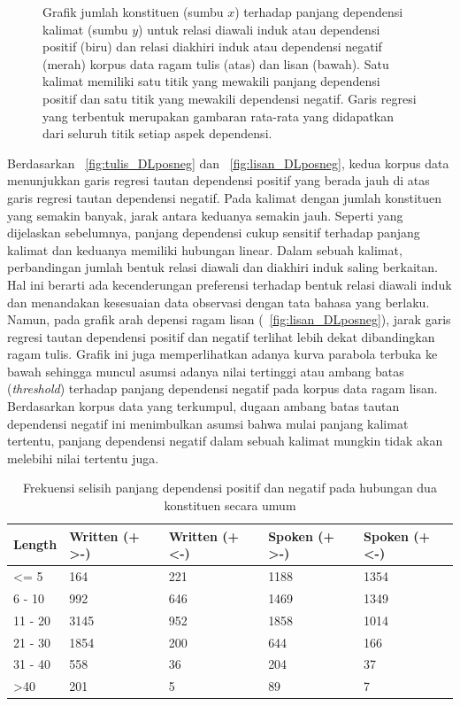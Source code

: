 \documentclass[10pt, a4paper, conference, compsocconf]{IEEEtran}
\begin{document}
\begin{figure}
\caption{Grafik jumlah konstituen (sumbu $x$) terhadap panjang dependensi kalimat (sumbu $y$) untuk relasi diawali induk atau dependensi positif (biru) dan relasi diakhiri induk atau dependensi negatif (merah) korpus data ragam tulis (atas) dan lisan (bawah). Satu kalimat memiliki satu titik yang mewakili panjang dependensi positif dan satu titik yang mewakili dependensi negatif. Garis regresi yang terbentuk merupakan gambaran rata-rata yang didapatkan dari seluruh titik setiap aspek dependensi.}
\label{fig:DL_posneg}
\end{figure}

Berdasarkan \pic~\ref{fig:tulis_DLposneg} dan \pic~\ref{fig:lisan_DLposneg}, kedua korpus data menunjukkan garis regresi tautan dependensi positif yang berada jauh di atas garis regresi tautan dependensi negatif. Pada kalimat dengan jumlah konstituen yang semakin banyak, jarak antara keduanya semakin jauh. Seperti yang dijelaskan sebelumnya, panjang dependensi cukup sensitif terhadap panjang kalimat dan keduanya memiliki hubungan linear. Dalam sebuah kalimat, perbandingan jumlah bentuk relasi diawali dan diakhiri induk saling berkaitan. Hal ini berarti ada kecenderungan preferensi terhadap bentuk relasi diawali induk dan menandakan kesesuaian data observasi dengan tata bahasa yang berlaku. Namun, pada grafik arah depensi ragam lisan (\pic~\ref{fig:lisan_DLposneg}), jarak garis regresi tautan dependensi positif dan negatif terlihat lebih dekat dibandingkan ragam tulis. Grafik ini juga memperlihatkan adanya kurva parabola terbuka ke bawah sehingga muncul asumsi adanya nilai tertinggi atau ambang batas (\textit{threshold}) terhadap panjang dependensi negatif pada korpus data ragam lisan. Berdasarkan korpus data yang terkumpul, dugaan ambang batas tautan dependensi negatif ini menimbulkan asumsi bahwa mulai panjang kalimat tertentu, panjang dependensi negatif dalam sebuah kalimat mungkin tidak akan melebihi nilai tertentu juga. 

\begin{table}
\begin{center}
\caption{Frekuensi selisih panjang dependensi positif dan negatif pada hubungan dua konstituen secara umum}  \label{tab:DLposneg}
\begin{tabular}{p{1.1cm} p{1.2cm} p{1.2cm} p{1.3cm} p{1.3cm}}
\hline
Length & Written (+ \textgreater -) & Written (+ \textless -) & Spoken (+ \textgreater -) & Spoken (+ \textless -) \\ \hline
\textless= 5 & 164 & 221 & 1188 & 1354 \\
6 - 10 & 992 & 646 &1469 & 1349 \\
11 - 20 & 3145 & 952 & 1858 & 1014 \\
21 - 30 & 1854 & 200 & 644 & 166 \\
31 - 40 & 558 & 36 & 204 & 37 \\
\textgreater 40 & 201 & 5 & 89 & 7 \\ \hline
 \end{tabular}
 \end{center}
 \end{table}
 
\end{document}
